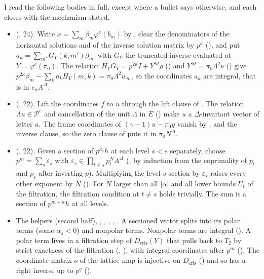 \documentclass[11pt]{article}
\newcommand{\NN}{N^{\Delta}}
\newcommand{\Pp}{\mathcal P}
\theoremstyle{definition}
\theoremstyle{remark}
\begin{document}
I read the following bodies in full, except where a bullet says otherwise, and each closes with the mechanism stated.
\begin{itemize}[leftmargin=*,itemsep=1pt]
\item {} (, 24). Write $x=\sum_m\beta_m\varphi^e(b_m)$ by , clear the denominators of the horizontal solutions and of the inverse solution matrix by $p^\kappa$ (), and put $a_k=\sum_{m'}G_Y(k,m')\beta_{m'}$ with $G_Y$ the truncated inverse evaluated at $Y=\varphi^e(\pi_0)$. The relation $H_YG_Y=p^{2\kappa}I+Y^M\rho$ () and $Y^M=\pi_0\Lambda^2\nu$ () give $p^{2\kappa}\beta_m-\sum_ka_kH_Y(m,k)=\pi_0\Lambda^2w_m$, so the coordinates $a_k$ are integral, that is in $e_aA^\Delta$.
\item {} (, 22). Lift the coordinates $f$ to $u$ through the lift clause of . The relation $\Lambda u\in\Pp^e$ and cancellation of the unit $\Lambda$ in $E$ () make $u$ a $\Delta$-invariant vector of letter $a$. The frame coordinates of $(\gamma-1)u-\pi_0y$ vanish by ,  and the inverse clause, so the zero clause of  puts it in $\pi_0\NN$.
\item {} (, 22). Given a section of $p^{\kappa_s}h$ at each level $s<e$ separately, choose $p^m=\sum_s\varepsilon_s$ with $\varepsilon_s\in\prod_{t\ne s}p_t^N A^\Delta$ (, by induction from the coprimality of $p_t$ and $p_s$ after inverting $p$). Multiplying the level-$s$ section by $\varepsilon_s$ raises every other exponent by $N$ (). For $N$ larger than all $\lvert\alpha\rvert$ and all lower bounds $U_t$ of the filtration, the filtration condition at $t\ne s$ holds trivially. The sum is a section of $p^{m+\kappa}h$ at all levels.
\item The  helpers  (second half), , , , , . A sectioned vector splits into its polar terms (some $\alpha_s<0$) and nonpolar terms. Nonpolar terms are integral (). A polar term lives in a filtration step of $D_{\mathrm{cris}}(Y)$ that pulls back to $T_2$ by strict exactness of the filtration (, ), with integral coordinates after $p^m$ (). The coordinate matrix $o$ of the lattice map is injective on $D_{\mathrm{cris}}$ () and so has a right inverse up to $p^q$ ().

\end{itemize}
\end{document}
